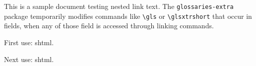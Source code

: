 \documentclass{article}
\begin{document}
This is a sample document testing nested link text.
The \texttt{glossaries-extra} package temporarily modifies
commands like \verb|\gls| or \verb|\glsxtrshort| that occur
in fields, when any of those field is accessed through linking
commands.

First use: \gls{shtml}.

\newpage

Next use: \gls{shtml}.

\newpage

\printglossaries
\end{document}
